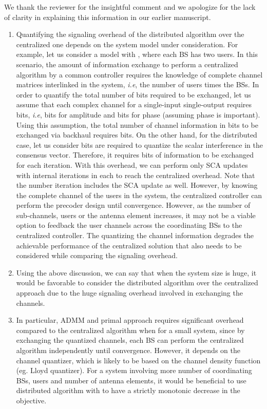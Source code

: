 \begin{enumerate}
\resp
	We thank the reviewer for the insightful comment and we apologize for the lack of clarity in explaining this information in our earlier manuscript.
	\begin{enumerate}
		\item Quantifying the signaling overhead of the distributed algorithm over the centralized one depends on the system model under consideration. For example, let us consider a model with , where each \ac{BS} has two users. In this scenario, the amount of information exchange to perform a centralized algorithm by a common controller requires the knowledge of complete channel matrices interlinked in the system, \textit{i.e}, the number of users times the \acp{BS}. In order to quantify the total number of bits required to be exchanged, let us assume that each complex channel for a single-input single-output requires  bits, \textit{i.e},  bits for amplitude and  bits for phase (assuming phase is important). Using this assumption, the total number of channel information in bits to be exchanged via backhaul requires  bits. On the other hand, for the distributed case, let us consider  bits are required to quantize the scalar interference in the consensus vector. Therefore, it requires  bits of information to be exchanged for each iteration. With this overhead, we can perform only  \ac{SCA} updates with  internal iterations in each to reach the centralized overhead. Note that the number iteration includes the \ac{SCA} update as well. However, by knowing the complete channel of the users in the system, the centralized controller can perform the precoder design until convergence. However, as the number of sub-channels, users or the antenna element increases, it may not be a viable option to feedback the user channels across the coordinating \acp{BS} to the centralized controller. The quantizing the channel information degrades the achievable performance of the centralized solution that also needs to be considered while comparing the signaling overhead.
		\item Using the above discussion, we can say that when the system size is huge, it would be favorable to consider the distributed algorithm over the centralized approach due to the huge signaling overhead involved in exchanging the channels.
		\item In particular, \ac{ADMM} and primal approach requires significant overhead compared to the centralized algorithm when  for a small system, since by exchanging the quantized channels, each \ac{BS} can perform the centralized algorithm independently until convergence. However, it depends on the channel quantizer, which is likely to be based on the channel density function (eg. Lloyd quantizer). For a system involving more number of coordinating \acp{BS}, users and number of antenna elements, it would be beneficial to use distributed algorithm with  to have a strictly monotonic decrease in the objective.

\end{enumerate}
\end{enumerate}
